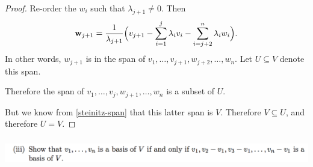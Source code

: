 \documentclass[12pt]{article}
\begin{document}
\begin{proof}

  Re-order the $w_i$ such that $\lambda_{j+1} \neq 0$. Then
  \begin{align*}
    \mathbf w_{j+1} = \frac{1}{\lambda_{j+1}}\Big(v_{j+1} - \sum_{i=1}^j \lambda_iv_i - \sum_{i=j+2}^n\lambda_iw_i\Big).
  \end{align*}
  In other words, $w_{j+1}$ is in the span of
  $v_1, \ldots, v_{j+1}, w_{j+2}, \ldots, w_n$. Let $U \subseteq V$ denote this
  span.

  Therefore the span of $v_1, \ldots, v_{j}, w_{j+1}, \ldots, w_n$ is a subset
  of $U$.

  But we know from \ref{steinitz-span} that this latter span is $V$. Therefore
  $V \subseteq U$, and therefore $U = V$.
\end{proof}



\newpage
\subsubsection*{}
\begin{mdframed}
\includegraphics[width=400pt]{img/oxford-prelims-2017-A-1-1-3.png}
\end{mdframed}
\end{document}
